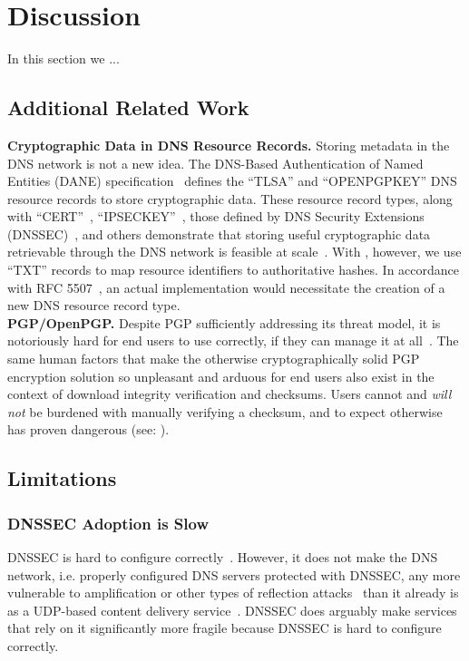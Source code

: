 \section{Discussion} \label{sec:discussion}

In this section we ...

\subsection{Additional Related Work}

\noindent\textbf{Cryptographic Data in DNS Resource Records.}    Storing
metadata in the DNS network is not a new idea. The DNS-Based Authentication of
Named Entities (DANE) specification~\cite{DANE1, DANE2, DANE3} defines the
``TLSA'' and ``OPENPGPKEY'' DNS resource records to store cryptographic data.
These resource record types, along with ``CERT''~\cite{CERT},
``IPSECKEY''~\cite{IPSECKEY}, those defined by DNS Security Extensions
(DNSSEC)~\cite{DNSSEC}, and others demonstrate that storing useful cryptographic
data retrievable through the DNS network is feasible at scale~\cite{DANE3,
DANE1}. With \SYSTEM{}, however, we use ``TXT'' records to map resource
identifiers to authoritative hashes. In accordance with RFC 5507~\cite{RFC5507},
an actual \SYSTEM{} implementation would necessitate the creation of a new DNS
resource record type. \\

\noindent\textbf{PGP/OpenPGP.}    Despite PGP sufficiently addressing its threat
model, it is notoriously hard for end users to use correctly, if they can manage
it at all~\cite{PGPBad}. The same human factors that make the otherwise
cryptographically solid PGP encryption solution so unpleasant and arduous for
end users also exist in the context of download integrity verification and
checksums. Users cannot and \textit{will not} be burdened with manually
verifying a checksum, and to expect otherwise has proven dangerous (see:
).

\subsection{Limitations}

\subsubsection{DNSSEC Adoption is Slow}

DNSSEC is hard to configure correctly~\cite{DNSSEC-is-hard-1, DNSSEC-is-hard-2,
DNSSEC-is-hard-3, DNSSEC-is-hard-4}. However, it does not make the DNS network,
i.e. properly configured DNS servers protected with DNSSEC, any more vulnerable
to amplification or other types of reflection attacks~\cite{Ariya} than it
already is as a UDP-based content delivery service~\cite{USCERT, Vixie}. DNSSEC
does arguably make services that rely on it significantly more fragile because
DNSSEC is hard to configure correctly.

